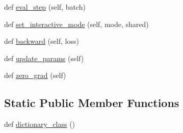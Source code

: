 \begin{DoxyCompactItemize}
\item 
def \hyperlink{classparlai_1_1core_1_1torch__agent_1_1TorchAgent_a18de0a52aeec4ef721aedbdd6ac06cad}{eval\+\_\+step} (self, batch)
\item 
def \hyperlink{classparlai_1_1core_1_1torch__agent_1_1TorchAgent_a6a7aff29231816a0f3cade9c72409dfc}{set\+\_\+interactive\+\_\+mode} (self, mode, shared)
\item 
def \hyperlink{classparlai_1_1core_1_1torch__agent_1_1TorchAgent_a8df662b1258ec67752b4fc0ad45733f9}{backward} (self, loss)
\item 
def \hyperlink{classparlai_1_1core_1_1torch__agent_1_1TorchAgent_a7e2c9e180887397daa6229a0f9700b1c}{update\+\_\+params} (self)
\item 
def \hyperlink{classparlai_1_1core_1_1torch__agent_1_1TorchAgent_a91c163f3e2d39b380095b7083f673b6e}{zero\+\_\+grad} (self)
\end{DoxyCompactItemize}
\subsection*{Static Public Member Functions}
\begin{DoxyCompactItemize}
\item 
def \hyperlink{classparlai_1_1core_1_1torch__agent_1_1TorchAgent_aea8849fa69a3f5dbd3216c8b06f180ea}{dictionary\+\_\+class} ()
\end{DoxyCompactItemize}
